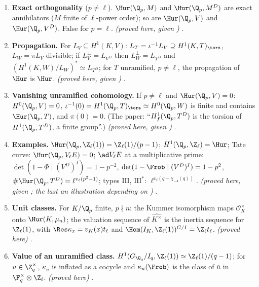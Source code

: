 \begin{sloppypar}
\begin{enumerate}[label=\textbf{\thechapter.\arabic*}]
\emph{(proved here, given  and ; types (C), (V) by passage to the limit)} .
\item \textbf{Exact orthogonality} ($p\ne\ell$). $\Hur(\Q_p,M)$ and $\Hur(\Q_p,M^D)$ are exact annihilators ($M$ finite of $\ell$-power order); so are $\Hur(\Q_p,V)$ and $\Hur(\Q_p,V^D)$.
False for $p=\ell$. \emph{(proved here, given )} .
\item \textbf{Propagation.} For $L_V\subseteq H^1(K,V)$: $L_T=\iota^{-1}L_V\supseteq H^1(K,T)_{\tors}$, $L_W=\pi L_V$ divisible; if $L_V^\perp=L_{V^D}$ then $L_W^\perp=L_{T^D}$ and
$(H^1(K,W)/L_W)^*\simeq L_{T^D}$; for $T$ unramified, $p\ne\ell$, the propagation of $\Hur$ is $\Hur$. \emph{(proved here, given )}
.
\item \textbf{Vanishing unramified cohomology.} If $p\ne\ell$ and $\Hur(\Q_p,V)=0$: $H^0(\Q_p,V)=0$, $\iota^{-1}(0)=H^1(\Q_p,T)_{\tors}\simeq H^0(\Q_p,W)$ is finite and contains $\Hur(\Q_p,T)$, and
$\pi(0)=0$. (The paper: ``$H^1_f(\Q_p,T^D)$ is the torsion of $H^1(\Q_p,T^D)$, a finite group''.) \emph{(proved here, given )}
.
\item \textbf{Examples.} $\Hur(\Q_p,\Z_\ell(1))=\Z_\ell(1)/(p-1)$; $H^1(\Q_p,\Z_\ell)=\Hur$; Tate curve: $\Hur(\Q_p,V_\ell E)=0$; $\ad V_\ell E$ at a multiplicative prime: $\det(1-\Phi\mid(V^D)^I)=1-p^{-2}$,
$\det(1-\Frob\mid(V^D)^I)=1-p^2$, $\#\Hur(\Q_p,T^D)=\ell^{v_\ell(p^2-1)}$; types $\mathrm{III}$, $\mathrm{III}^*$: $\ell^{v_\ell(q-\chi_{-4}(q))}$. \emph{(proved here, given ; the last an illustration depending on )}
.
\item \textbf{Unit classes.} For $K/\Q_p$ finite, $p\nmid n$: the Kummer isomorphism maps $\mathcal O_K^\times$ onto $\Hur(K,\mu_n)$; the valuation sequence of $\widehat{K^\times}$ is the inertia
sequence for $\Z_\ell(1)$, with $\Res\kappa_x=v_K(x)t_\ell$ and $\Hom(I_K,\Z_\ell(1))^{G/I}=\Z_\ell t_\ell$. \emph{(proved here)} .
\item \textbf{Value of an unramified class.} $H^1(G_{\Q_q}/I_q,\Z_\ell(1))\simeq\Z_\ell(1)/(q-1)$; for $u\in\Z_q^\times$, $\kappa_u$ is inflated as a cocycle and $\kappa_u(\Frob)$ is the class of $\bar u$ in
$\F_q^\times\otimes\Z_\ell$. \emph{(proved here)} .

\end{enumerate}
\end{sloppypar}
